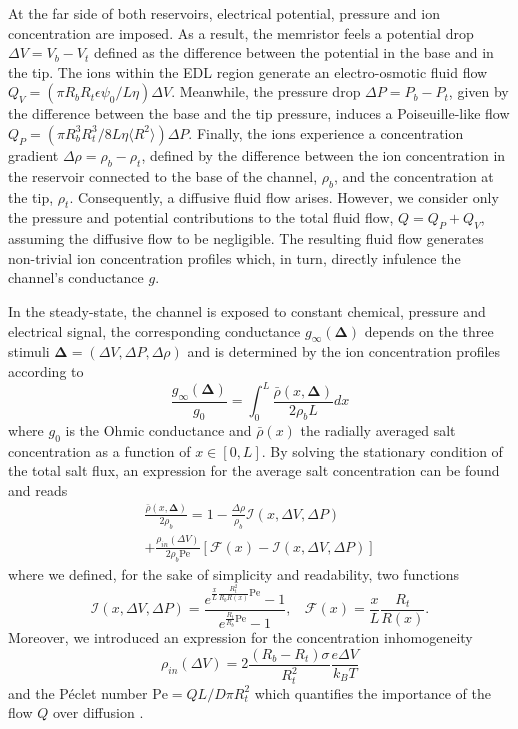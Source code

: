 \documentclass[reprint,superscriptaddress,prb,showkeys]{revtex4-2}
\newcommand{\brac}[1]{\left(#1 \right)} %
\begin{document}
At the far side of both reservoirs, electrical potential, pressure and ion concentration are imposed. As a result, the memristor feels a potential drop $\Delta V = V_b - V_t$ defined as the difference between the potential in the base and in the tip. The ions within the EDL region generate an electro-osmotic fluid flow $Q_V = (\pi R_b R_t\epsilon\psi_0/L\eta)\Delta V$. Meanwhile, the pressure drop $\Delta P = P_b - P_t$, given by the difference between the base and the tip pressure, induces a Poiseuille-like flow $Q_P = (\pi R_b^3 R_t^3/8L\eta\langle R^2\rangle)\Delta P$. Finally, the ions experience a concentration gradient $\Delta \rho = \rho_b - \rho_t$, defined by the difference between the ion concentration in the reservoir connected to the base of the channel, $\rho_b$, and the concentration at the tip, $\rho_t$. Consequently, a diffusive fluid flow arises. However, we consider only the pressure and potential contributions to the total fluid flow, $Q = Q_P + Q_V$, assuming the diffusive flow to be negligible.  The resulting fluid flow generates non-trivial ion concentration profiles which, in turn, directly infulence the channel's conductance $g$. 

In the steady-state, the channel is exposed to constant chemical, pressure and electrical signal, the corresponding conductance $g_{\infty}\brac{\boldsymbol{\Delta}}$ depends on the three stimuli $\boldsymbol{\Delta}= (\Delta V, \Delta P, \Delta \rho)$ and is determined by the ion concentration profiles according to 
\[
\frac{g_{\infty}\brac{\boldsymbol{\Delta}}}{g_0} = \int_0^{L} \frac{\bar{\rho}\left(x, \boldsymbol{\Delta}\right)}{2\rho_b L} dx                                           
\]
where $g_0$ is the Ohmic conductance and $\bar{\rho}(x)$ the radially averaged salt concentration as a function of $x\in[0,L]$\cite{Rene_IonicNeuromorphic}. By solving the stationary condition of the total salt flux, an expression for the average salt concentration can be found and reads
\begin{multline}
\frac{\bar{\rho}\left(x, \boldsymbol{\Delta}\right)}{2\rho_b} = 1 - \frac{\Delta \rho}{\rho_b} \mathcal{I}\left(x, \Delta V, \Delta P\right) \\
 + \frac{ \rho_{in}\left( \Delta V \right) }{2\rho_b \text{Pe}} \left[ \mathcal{F}(x) - \mathcal{I}\left(x, \Delta V, \Delta P\right) \right]
\label{eq:rho_average}
\end{multline}
where we defined, for the sake of simplicity and readability, two functions
\[
\mathcal{I}\left(x, \Delta V, \Delta P\right) = \frac{e^{\frac{x}{L}\frac{R_t^2}{R_b R(x)} \text{Pe}}-1}{e^{\frac{R_t}{R_b} \text{Pe}}-1}, \ \ \ \ \mathcal{F}(x) = \frac{x}{L}\frac{R_t}{R(x)}.
\]
Moreover, we introduced an expression for the concentration inhomogeneity 
\[
\rho_{in}\brac{\Delta V} = 2\frac{(R_b-R_t)\sigma}{R_t^2}\frac{e\Delta V}{k_B T}
\]
and the Péclet number
$
\text{Pe} = QL/D\pi R_t^2
$
which quantifies the importance of the flow $Q$ over diffusion \cite{Rene_PressureSensitive}.
\end{document}
